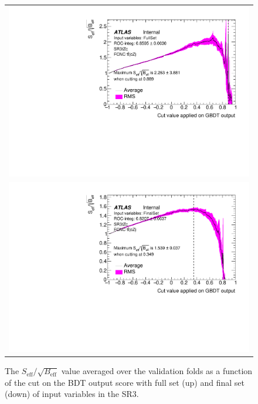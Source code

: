 \begin{figure}[!htbp]
	\centering
	\begin{tabular}{c}
		\includegraphics[width=.65\textwidth]{Chapters/CH6/figures/SR3_UsingSMT/BDT/FullSet/CutEff_FullSet}\\
		\includegraphics[width=.65\textwidth]{Chapters/CH6/figures/SR3_UsingSMT/BDT/FinalSet/CutEff_FinalSet}
	\end{tabular}
	\caption{ The $S_{\text{eff}}/\sqrt{B_{\text{eff}}}$ value averaged over the validation folds as a function of the cut on the BDT output score with full set (up) and final set (down) of input variables in the SR3.}
	\label{app:BDT:fig:SR3:CutEff}
\end{figure}

